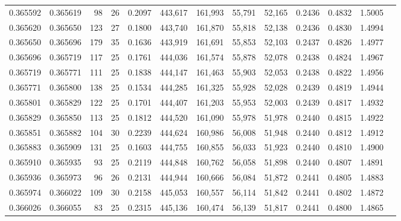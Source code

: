 \begin{tabular}{rrrrrrrrrrrrr}
0.365592 & 0.365619 &    98 &  26 &                                     0.2097 & 443,617 & 161,993 &  55,791 &  52,165 & 0.2436 & 0.4832 & 1.5005 \\
0.365620 & 0.365650 &   123 &  27 &                                     0.1800 & 443,740 & 161,870 &  55,818 &  52,138 & 0.2436 & 0.4830 & 1.4994 \\
0.365650 & 0.365696 &   179 &  35 &                                     0.1636 & 443,919 & 161,691 &  55,853 &  52,103 & 0.2437 & 0.4826 & 1.4977 \\
0.365696 & 0.365719 &   117 &  25 &                                     0.1761 & 444,036 & 161,574 &  55,878 &  52,078 & 0.2438 & 0.4824 & 1.4967 \\
0.365719 & 0.365771 &   111 &  25 &                                     0.1838 & 444,147 & 161,463 &  55,903 &  52,053 & 0.2438 & 0.4822 & 1.4956 \\
0.365771 & 0.365800 &   138 &  25 &                                     0.1534 & 444,285 & 161,325 &  55,928 &  52,028 & 0.2439 & 0.4819 & 1.4944 \\
0.365801 & 0.365829 &   122 &  25 &                                     0.1701 & 444,407 & 161,203 &  55,953 &  52,003 & 0.2439 & 0.4817 & 1.4932 \\
0.365829 & 0.365850 &   113 &  25 &                                     0.1812 & 444,520 & 161,090 &  55,978 &  51,978 & 0.2440 & 0.4815 & 1.4922 \\
0.365851 & 0.365882 &   104 &  30 &                                     0.2239 & 444,624 & 160,986 &  56,008 &  51,948 & 0.2440 & 0.4812 & 1.4912 \\
0.365883 & 0.365909 &   131 &  25 &                                     0.1603 & 444,755 & 160,855 &  56,033 &  51,923 & 0.2440 & 0.4810 & 1.4900 \\
0.365910 & 0.365935 &    93 &  25 &                                     0.2119 & 444,848 & 160,762 &  56,058 &  51,898 & 0.2440 & 0.4807 & 1.4891 \\
0.365936 & 0.365973 &    96 &  26 &                                     0.2131 & 444,944 & 160,666 &  56,084 &  51,872 & 0.2441 & 0.4805 & 1.4883 \\
0.365974 & 0.366022 &   109 &  30 &                                     0.2158 & 445,053 & 160,557 &  56,114 &  51,842 & 0.2441 & 0.4802 & 1.4872 \\
0.366026 & 0.366055 &    83 &  25 &                                     0.2315 & 445,136 & 160,474 &  56,139 &  51,817 & 0.2441 & 0.4800 & 1.4865 \\

\end{tabular}
